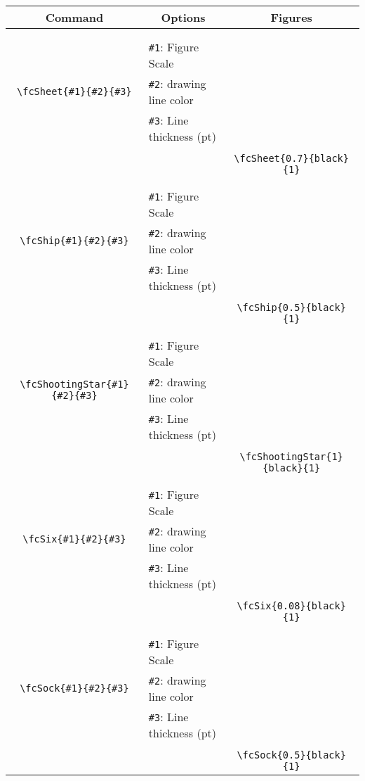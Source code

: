 \documentclass{article}
\begin{document}
\begin{table}[H]\centering\begin{tabular}{|c|l|c|}\hline {\bf Command}& \multicolumn{1}{c|}{{\bf Options}} & {\bf Figures}\\  \hline	&&\multirow{5}{*}{\fcSheet{0.7}{black}{1}}\\	&&\\	&\verb|#1|: Figure Scale &\\	\verb|\fcSheet{#1}{#2}{#3}|&	\verb|#2|: drawing line color &\\	&\verb|#3|: Line thickness (pt) &\\ &&\\&&	\verb|\fcSheet{0.7}{black}{1}|\\\hline 	
	&&\multirow{5}{*}{\fcShip{0.5}{black}{1}}\\	&&\\	&\verb|#1|: Figure Scale &\\	\verb|\fcShip{#1}{#2}{#3}|&	\verb|#2|: drawing line color &\\	&\verb|#3|: Line thickness (pt) &\\ &&\\&&	\verb|\fcShip{0.5}{black}{1}|\\\hline 	
	&&\multirow{5}{*}{\fcShootingStar{1}{black}{1}}\\	&&\\	&\verb|#1|: Figure Scale &\\	\verb|\fcShootingStar{#1}{#2}{#3}|&	\verb|#2|: drawing line color &\\	&\verb|#3|: Line thickness (pt) &\\ &&\\&&	\verb|\fcShootingStar{1}{black}{1}|\\\hline 	
	&&\multirow{5}{*}{\fcSix{0.08}{black}{1}}\\	&&\\	&\verb|#1|: Figure Scale &\\	\verb|\fcSix{#1}{#2}{#3}|&	\verb|#2|: drawing line color &\\	&\verb|#3|: Line thickness (pt) &\\ &&\\&&	\verb|\fcSix{0.08}{black}{1}|\\\hline 	
	&&\multirow{5}{*}{\fcSock{0.5}{black}{1}}\\	&&\\	&\verb|#1|: Figure Scale &\\	\verb|\fcSock{#1}{#2}{#3}|&	\verb|#2|: drawing line color &\\	&\verb|#3|: Line thickness (pt) &\\ &&\\&&	\verb|\fcSock{0.5}{black}{1}|\\\hline 	

\end{tabular}
\end{table}
\end{document}
